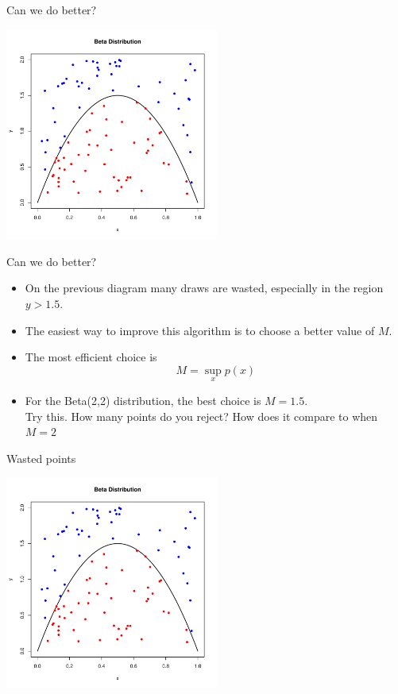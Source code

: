 \documentclass
[handout]
{beamer}
\begin{document}
\begin{frame}{Can we do better?}
\begin{center}
\includegraphics[height=7cm]{./Pics/bet3.pdf}
\end{center}
\end{frame}
\begin{frame}{Can we do better?}
\begin{itemize}
\item On the previous diagram many draws are wasted, especially in the region $y>1.5$.
\pause
\item The easiest way to improve this algorithm is to choose a better value of $M$.
\pause
\item The most efficient choice is
\begin{equation}
M=\sup_x p(x)
\end{equation}
\pause
\item For the Beta(2,2) distribution, the best choice is $M=1.5$.\\
\pause Try this. How many points do you reject?  How does it compare to when $M=2$
\end{itemize}
\end{frame}
\begin{frame}{Wasted points}
\begin{center}
\includegraphics[height=7cm]{./Pics/bet3.pdf}
\end{center}
\end{frame}
\end{document}
